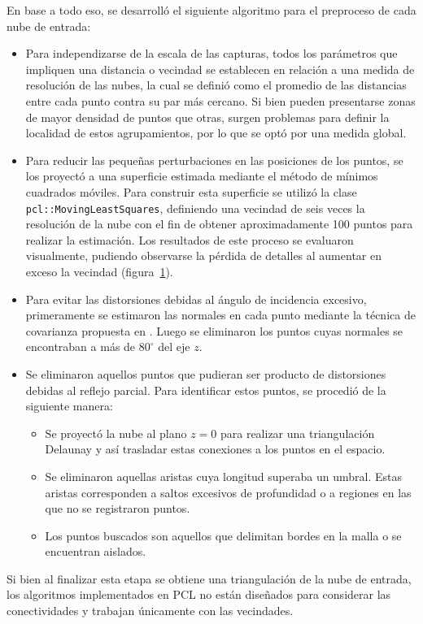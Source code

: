En base a todo eso, se desarrolló el siguiente algoritmo
para el preproceso de cada nube de entrada:
\begin{itemize}
	\item Para independizarse de la escala de las capturas,
		todos los parámetros que impliquen una distancia o vecindad
		se establecen en relación a una medida de resolución de las nubes,
		la cual se definió como el promedio de las distancias entre cada punto
		contra su par más cercano.
		Si bien pueden presentarse zonas de mayor densidad de puntos que otras,
		surgen problemas para definir la localidad de estos agrupamientos,
		por lo que se optó por una medida global.

	\item Para reducir las pequeñas perturbaciones en las posiciones de los puntos,
		se los proyectó a una superficie estimada mediante el método de mínimos cuadrados móviles.
		Para construir esta superficie se utilizó la clase
		\texttt{pcl::Moving\-Least\-Squares}, definiendo una vecindad de seis veces la
		resolución de la nube con el fin de obtener aproximadamente 100 puntos para
		realizar la estimación.
		Los resultados de este proceso se evaluaron visualmente, pudiendo observarse la pérdida de detalles
		al aumentar en exceso la vecindad (figura~\ref{fig:mls}). 
		\begin{figure}
			\caption{\label{fig:mls}}
		\end{figure}

	\item Para evitar las distorsiones debidas al ángulo de incidencia excesivo,
		primeramente se estimaron las normales en cada punto mediante la técnica de covarianza propuesta en \cite{10.1109/34.334391}.
		Luego se eliminaron los puntos cuyas normales se encontraban a más de $80^{\circ}$ del eje $z$.

	\item Se eliminaron aquellos puntos que pudieran ser producto de distorsiones debidas al reflejo parcial.
		Para identificar estos puntos, se procedió de la siguiente manera:
		\begin{itemize}
			\item {}
				Se proyectó la nube al plano $z=0$ para realizar una triangulación Delaunay y así
				trasladar estas conexiones a los puntos en el espacio.
			\item Se eliminaron aquellas aristas cuya longitud superaba un umbral.
				Estas aristas corresponden a saltos excesivos de profundidad
				o a regiones en las que no se registraron puntos.
			\item Los puntos buscados son aquellos que delimitan bordes en la malla o se encuentran aislados.
		\end{itemize}
\end{itemize}

Si bien al finalizar esta etapa se obtiene una triangulación de la nube de entrada,
los algoritmos implementados en PCL no están diseñados para considerar las conectividades y trabajan únicamente con las vecindades.
